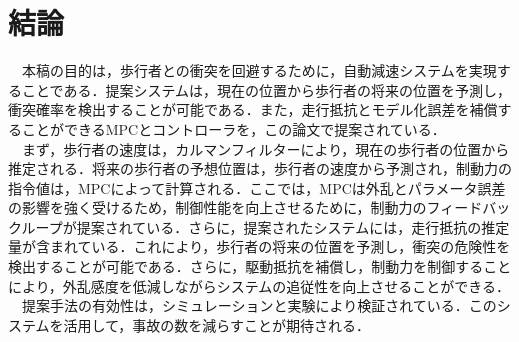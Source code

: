 \chapter{結論}
　本稿の目的は，歩行者との衝突を回避するために，自動減速システムを実現することである．提案システムは，現在の位置から歩行者の将来の位置を予測し，衝突確率を検出することが可能である．また，走行抵抗とモデル化誤差を補償することができるMPCとコントローラを，この論文で提案されている．\\
　まず，歩行者の速度は，カルマンフィルターにより，現在の歩行者の位置から推定される．将来の歩行者の予想位置は，歩行者の速度から予測され，制動力の指令値は，MPCによって計算される．ここでは，MPCは外乱とパラメータ誤差の影響を強く受けるため，制御性能を向上させるために，制動力のフィードバックループが提案されている．さらに，提案されたシステムには，走行抵抗の推定量が含まれている．これにより，歩行者の将来の位置を予測し，衝突の危険性を検出することが可能である．さらに，駆動抵抗を補償し，制動力を制御することにより，外乱感度を低減しながらシステムの追従性を向上させることができる．\\
　提案手法の有効性は，シミュレーションと実験により検証されている．このシステムを活用して，事故の数を減らすことが期待される．